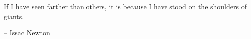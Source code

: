 If I have seen farther than others,
it is because I have stood on the shoulders of giants.

-- Issac Newton
